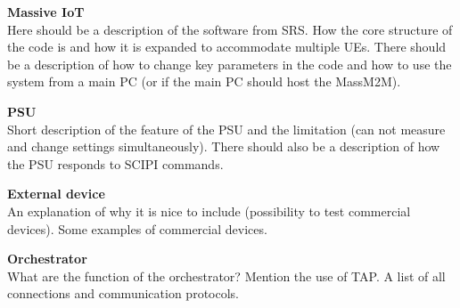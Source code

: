 \textbf{Massive IoT}\\
Here should be a description of the software from SRS. How the core structure of the code is and how it is expanded to accommodate multiple UEs. There should be a description of how to change key parameters in the code and how to use the system from a main PC (or if the main PC should host the MassM2M).

\textbf{PSU}\\
Short description of the feature of the PSU and the limitation (can not measure and change settings simultaneously). There should also be a description of how the PSU responds to SCIPI commands.

\textbf{External device}\\
An explanation of why it is nice to include (possibility to test commercial devices). Some examples of commercial devices. 

\textbf{Orchestrator}\\
What are the function of the orchestrator? Mention the use of TAP. A list of all connections and communication protocols. 



